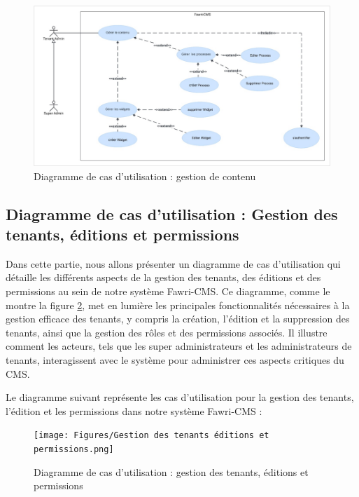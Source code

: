 
\begin{figure}[H]
  \centering
  \includegraphics[width=17cm]{Figures/gestion de contenu.png}
  \caption{Diagramme de cas d'utilisation : gestion de contenu}
  \label{diag3} %
\end{figure}



\subsection{Diagramme de cas d'utilisation : Gestion des tenants, éditions et permissions}

\hspace{\parindent}Dans cette partie, nous allons présenter un diagramme de cas d'utilisation qui détaille les différents aspects de la gestion des tenants, des éditions et des permissions au sein de notre système Fawri-CMS. Ce diagramme, comme le montre la figure \ref*{diag4}, met en lumière les principales fonctionnalités nécessaires à la gestion efficace des tenants, y compris la création, l'édition et la suppression des tenants, ainsi que la gestion des rôles et des permissions associés. Il illustre comment les acteurs, tels que les super administrateurs et les administrateurs de tenants, interagissent avec le système pour administrer ces aspects critiques du CMS.

Le diagramme suivant représente les cas d'utilisation pour la gestion des tenants, l'édition et les permissions dans notre système Fawri-CMS :

\begin{figure}[H]
  \centering
  \texttt{[image: Figures/Gestion des tenants éditions et permissions.png]}
  \caption{Diagramme de cas d'utilisation : gestion des tenants, éditions et permissions}
  \label{diag4} %
\end{figure}





